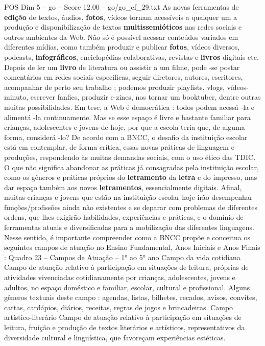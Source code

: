 \begin{textsample}{POS Dim 5 – go – Score 12.00 – go/go\_ef\_29.txt}
As novas ferramentas de \textbf{edição} de textos, áudios, \textbf{fotos}, vídeos tornam acessíveis a qualquer um a produção e disponibilização de textos \textbf{multissemióticos} nas redes sociais e outros ambientes da Web.
Não só é possível acessar conteúdos variados em diferentes mídias, como também produzir e publicar \textbf{fotos}, vídeos diversos, podcasts, \textbf{infográficos}, enciclopédias colaborativas, revistas e \textbf{livros} digitais etc.
Depois de ler um \textbf{livro} de literatura ou assistir a um filme, pode -se postar comentários em redes sociais específicas, seguir diretores, autores, escritores, acompanhar de perto seu trabalho ; podemos produzir playlists, vlogs, vídeos-minuto, escrever fanfics, produzir e-zines, nos tornar um booktuber, dentre outras muitas possibilidades.
Em tese, a Web é democrática : todos podem acessá -la e alimentá -la continuamente.
Mas se esse espaço é livre e bastante familiar para crianças, adolescentes e jovens de hoje, por que a escola teria que, de alguma forma, considerá -lo?
De acordo com a BNCC, o desafio da instituição escolar está em contemplar, de forma crítica, essas novas práticas de linguagem e produções, respondendo às muitas demandas sociais, com o uso ético das TDIC.
O que não significa abandonar as práticas já consagradas pela instituição escolar, como os gêneros e práticas próprios do \textbf{letramento} da \textbf{letra} e do impresso, mas dar espaço também aos novos \textbf{letramentos}, essencialmente digitais.
Afinal, muitas crianças e jovens que estão na instituição escolar hoje irão desempenhar funções/profissões ainda não existentes e se deparar com problemas de diferentes ordens, que lhes exigirão habilidades, experiências e práticas, e o domínio de ferramentas atuais e diversificadas para a mobilização das diferentes linguagens.
Nesse sentido, é importante compreender como a BNCC propõe e conceitua os seguintes campos de atuação no Ensino Fundamental, Anos Iniciais e Anos Finais : Quadro 23 – Campos de Atuação – 1{\EmojiFont °} ao 5{\EmojiFont °} ano Campo da vida cotidiana Campo de atuação relativo à participação em situações de leitura, próprias de atividades vivenciadas cotidianamente por crianças, adolescentes, jovens e adultos, no espaço doméstico e familiar, escolar, cultural e profissional.
Alguns gêneros textuais deste campo : agendas, listas, bilhetes, recados, avisos, convites, cartas, cardápios, diários, receitas, regras de jogos e brincadeiras.
Campo artístico-literário Campo de atuação relativo à participação em situações de leitura, fruição e produção de textos literários e artísticos, representativos da diversidade cultural e linguística, que favoreçam experiências estéticas.

\end{textsample}
